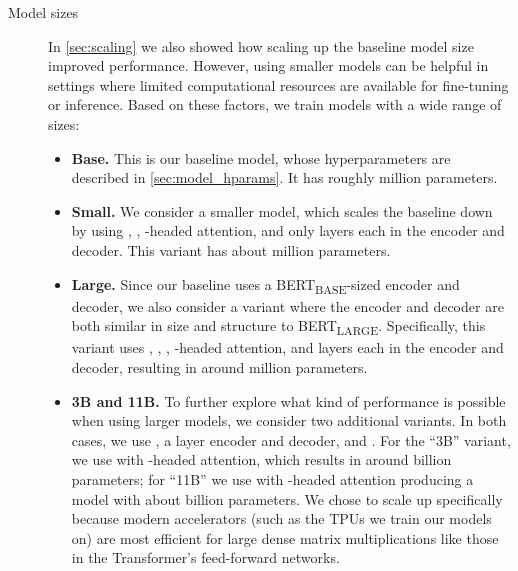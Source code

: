 \documentclass[twoside,11pt]{article}
\begin{document}
\begin{description}
\item[Model sizes] In \cref{sec:scaling} we also showed how scaling up the baseline model size improved performance.
However, using smaller models can be helpful in settings where limited computational resources are available for fine-tuning or inference.
Based on these factors, we train models with a wide range of sizes:
\begin{itemize}
  \item \textbf{Base.} This is our baseline model, whose hyperparameters are described in \cref{sec:model_hparams}. It has roughly  million parameters.
  \item \textbf{Small.} We consider a smaller model, which scales the baseline down by using , , -headed attention, and only  layers each in the encoder and decoder. This variant has about  million parameters.
  \item \textbf{Large.} Since our baseline uses a BERT\textsubscript{BASE}-sized encoder and decoder, we also consider a variant where the encoder and decoder are both similar in size and structure to BERT\textsubscript{LARGE}. Specifically, this variant uses , , , -headed attention, and  layers each in the encoder and decoder, resulting in around  million parameters.
  \item \textbf{3B and 11B.} To further explore what kind of performance is possible when using larger models, we consider two additional variants. In both cases, we use , a  layer encoder and decoder, and . For the ``3B'' variant, we use  with -headed attention, which results in around  billion parameters; for ``11B'' we use  with -headed attention producing a model with about  billion parameters. We chose to scale up  specifically because modern accelerators (such as the TPUs we train our models on) are most efficient for large dense matrix multiplications like those in the Transformer's feed-forward networks.
\end{itemize}


\end{description}
\end{document}
